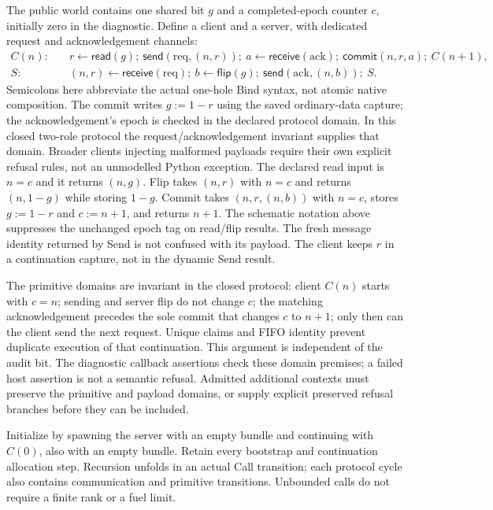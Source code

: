 \documentclass[11pt]{article}
\begin{document}
The public world contains one shared bit $g$ and a completed-epoch counter $c$, initially zero in the diagnostic. Define a client and a server, with dedicated request and acknowledgement channels:
\[
\begin{aligned}
C(n):\quad&
r\leftarrow\mathsf{read}(g);\
\mathsf{send}(\mathrm{req},(n,r));\
a\leftarrow\mathsf{receive}(\mathrm{ack});\
\mathsf{commit}(n,r,a);\
C(n+1),\\
S:\quad&
(n,r)\leftarrow\mathsf{receive}(\mathrm{req});\
b\leftarrow\mathsf{flip}(g);\
\mathsf{send}(\mathrm{ack},(n,b));\
S .
\end{aligned}
\]
Semicolons here abbreviate the actual one-hole Bind syntax, not atomic native composition. The commit writes $g:=1-r$ using the saved ordinary-data capture; the acknowledgement's epoch is checked in the declared protocol domain. In this closed two-role protocol the request/acknowledgement invariant supplies that domain. Broader clients injecting malformed payloads require their own explicit refusal rules, not an unmodelled Python exception. The declared read input is $n=c$ and it returns $(n,g)$. Flip takes $(n,r)$ with $n=c$ and returns $(n,1-g)$ while storing $1-g$. Commit takes $(n,r,(n,b))$ with $n=c$, stores $g:=1-r$ and $c:=n+1$, and returns $n+1$. The schematic notation above suppresses the unchanged epoch tag on read/flip results. The fresh message identity returned by Send is not confused with its payload. The client keeps $r$ in a continuation capture, not in the dynamic Send result.

The primitive domains are invariant in the closed protocol: client $C(n)$ starts with $c=n$; sending and server flip do not change $c$; the matching acknowledgement precedes the sole commit that changes $c$ to $n+1$; only then can the client send the next request. Unique claims and FIFO identity prevent duplicate execution of that continuation. This argument is independent of the audit bit. The diagnostic callback assertions check these domain premises; a failed host assertion is not a semantic refusal. Admitted additional contexts must preserve the primitive and payload domains, or supply explicit preserved refusal branches before they can be included.

Initialize by spawning the server with an empty bundle and continuing with $C(0)$, also with an empty bundle. Retain every bootstrap and continuation allocation step. Recursion unfolds in an actual Call transition; each protocol cycle also contains communication and primitive transitions. Unbounded calls do not require a finite rank or a fuel limit.
\end{document}
